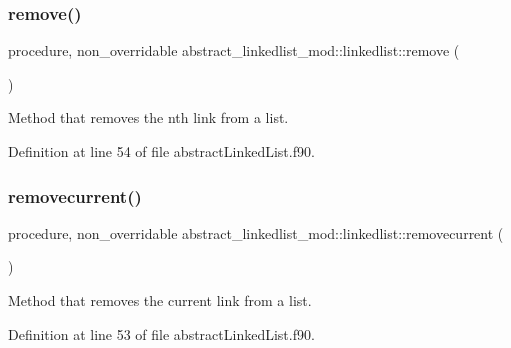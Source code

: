 \subsubsection{\texorpdfstring{remove()}{remove()}}
{\footnotesize\ttfamily procedure, non\+\_\+overridable abstract\+\_\+linkedlist\+\_\+mod\+::linkedlist\+::remove (\begin{DoxyParamCaption}{ }\end{DoxyParamCaption})\hspace{0.3cm}{\ttfamily [private]}}



Method that removes the nth link from a list. 



Definition at line 54 of file abstract\+Linked\+List.\+f90.

\mbox{\label{structabstract__linkedlist__mod_1_1linkedlist_a7bca8c31961be692d5c377c309d6cbd2}} 
\subsubsection{\texorpdfstring{removecurrent()}{removecurrent()}}
{\footnotesize\ttfamily procedure, non\+\_\+overridable abstract\+\_\+linkedlist\+\_\+mod\+::linkedlist\+::removecurrent (\begin{DoxyParamCaption}{ }\end{DoxyParamCaption})\hspace{0.3cm}{\ttfamily [private]}}



Method that removes the current link from a list. 



Definition at line 53 of file abstract\+Linked\+List.\+f90.

\mbox{\label{structabstract__linkedlist__mod_1_1linkedlist_a3eb28d7a77ee8613ed566ec0148a1bd3}} 

